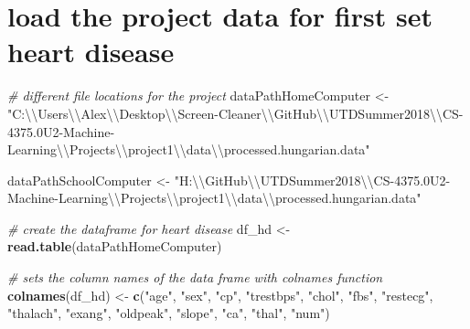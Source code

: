 \documentclass[]{article}
\newenvironment{Shaded}{\begin{snugshade}}{\end{snugshade}}
\newcommand{\KeywordTok}[1]{\textcolor[rgb]{0.13,0.29,0.53}{\textbf{#1}}}
\newcommand{\CharTok}[1]{\textcolor[rgb]{0.31,0.60,0.02}{#1}}
\newcommand{\StringTok}[1]{\textcolor[rgb]{0.31,0.60,0.02}{#1}}
\newcommand{\CommentTok}[1]{\textcolor[rgb]{0.56,0.35,0.01}{\textit{#1}}}
\newcommand{\NormalTok}[1]{#1}
\begin{document}
\section{load the project data for first set heart
disease}\label{load-the-project-data-for-first-set-heart-disease}

\begin{Shaded}
\begin{Highlighting}[]
\CommentTok{# different file locations for the project}
\NormalTok{dataPathHomeComputer <-}\StringTok{ "C:}\CharTok{\textbackslash{}\textbackslash{}}\StringTok{Users}\CharTok{\textbackslash{}\textbackslash{}}\StringTok{Alex}\CharTok{\textbackslash{}\textbackslash{}}\StringTok{Desktop}\CharTok{\textbackslash{}\textbackslash{}}\StringTok{Screen-Cleaner}\CharTok{\textbackslash{}\textbackslash{}}\StringTok{GitHub}\CharTok{\textbackslash{}\textbackslash{}}\StringTok{UTDSummer2018}\CharTok{\textbackslash{}\textbackslash{}}\StringTok{CS-4375.0U2-Machine-Learning}\CharTok{\textbackslash{}\textbackslash{}}\StringTok{Projects}\CharTok{\textbackslash{}\textbackslash{}}\StringTok{project1}\CharTok{\textbackslash{}\textbackslash{}}\StringTok{data}\CharTok{\textbackslash{}\textbackslash{}}\StringTok{processed.hungarian.data"}

\NormalTok{dataPathSchoolComputer <-}\StringTok{ "H:}\CharTok{\textbackslash{}\textbackslash{}}\StringTok{GitHub}\CharTok{\textbackslash{}\textbackslash{}}\StringTok{UTDSummer2018}\CharTok{\textbackslash{}\textbackslash{}}\StringTok{CS-4375.0U2-Machine-Learning}\CharTok{\textbackslash{}\textbackslash{}}\StringTok{Projects}\CharTok{\textbackslash{}\textbackslash{}}\StringTok{project1}\CharTok{\textbackslash{}\textbackslash{}}\StringTok{data}\CharTok{\textbackslash{}\textbackslash{}}\StringTok{processed.hungarian.data"}

\CommentTok{# create the dataframe for heart disease}
\NormalTok{df_hd <-}\StringTok{ }\KeywordTok{read.table}\NormalTok{(dataPathHomeComputer)}

\CommentTok{# sets the column names of the data frame with colnames function}
\KeywordTok{colnames}\NormalTok{(df_hd) <-}\StringTok{ }\KeywordTok{c}\NormalTok{(}\StringTok{"age"}\NormalTok{, }\StringTok{"sex"}\NormalTok{, }\StringTok{"cp"}\NormalTok{, }\StringTok{"trestbps"}\NormalTok{, }\StringTok{"chol"}\NormalTok{, }\StringTok{"fbs"}\NormalTok{, }\StringTok{"restecg"}\NormalTok{, }\StringTok{"thalach"}\NormalTok{, }\StringTok{"exang"}\NormalTok{, }\StringTok{"oldpeak"}\NormalTok{, }\StringTok{"slope"}\NormalTok{, }\StringTok{"ca"}\NormalTok{, }\StringTok{"thal"}\NormalTok{, }\StringTok{"num"}\NormalTok{)}




\end{Highlighting}
\end{Shaded}
\end{document}
